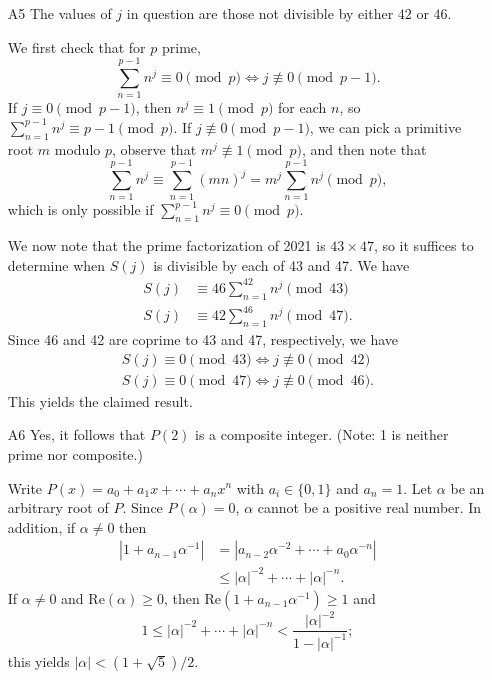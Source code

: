 \documentclass[amssymb,twocolumn,pra,10pt,aps]{revtex4-1}
\begin{document}
\begin{itemize}
\item[A5]
The values of $j$ in question are those not divisible by either $42$ or $46$.

We first check that for $p$ prime,
\[
\sum_{n=1}^{p-1} n^j \equiv 0 \pmod{p} \Leftrightarrow j \not\equiv 0 \pmod{p-1}.
\]
If $j \equiv 0 \pmod{p-1}$, then $n^j \equiv 1 \pmod{p}$ for each $n$, so $\sum_{n=1}^{p-1} n^j \equiv p-1 \pmod{p}$. If $j \not\equiv 0 \pmod{p-1}$, we can pick a primitive root $m$ modulo $p$,
observe that $m^j \not\equiv 1 \pmod{p}$, and then note that
\[
\sum_{n=1}^{p-1} n^j \equiv \sum_{n=1}^{p-1} (mn)^j = m^j \sum_{n=1}^{p-1} n^j \pmod{p},
\]
which is only possible if $\sum_{n=1}^{p-1} n^j \equiv 0 \pmod{p}$.

We now note that the prime factorization of 2021 is $43 \times 47$,
so it suffices to determine when $S(j)$ is divisible by each of 43 and 47.
We have
\begin{align*}
S(j) &\equiv 46 \sum_{n=1}^{42} n^j \pmod{43} \\
S(j) &\equiv 42 \sum_{n=1}^{46} n^j \pmod{47}.
\end{align*}
Since 46 and 42 are coprime to 43 and 47, respectively, 
we have 
\begin{gather*}
S(j) \equiv 0 \pmod{43} \Leftrightarrow j \not\equiv 0 \pmod{42} \\
S(j) \equiv 0 \pmod{47} \Leftrightarrow j \not\equiv 0 \pmod{46}.
\end{gather*}
This yields the claimed result.

\item[A6]
Yes, it follows that $P(2)$ is a composite integer. (Note: 1 is neither prime nor composite.)

Write $P(x) = a_0 + a_1 x + \cdots + a_n x^n$ with $a_i \in \{0,1\}$ and $a_n = 1$.
Let $\alpha$ be an arbitrary root of $P$. Since $P(\alpha) = 0$, $\alpha$ cannot be a positive real number.
%
In addition, if $\alpha \neq 0$ then
\begin{align*}
|1 + a_{n-1} \alpha^{-1}| &= |a_{n-2} \alpha^{-2} + \cdots + a_0 \alpha^{-n}| \\
&\leq |\alpha|^{-2} + \cdots + |\alpha|^{-n}.
\end{align*}
If $\alpha \neq 0$ and $\mathrm{Re}(\alpha) \geq 0$, then $\mathrm{Re}(1 + a_{n-1} \alpha^{-1}) \geq 1$
and 
\[
1 \leq |\alpha|^{-2} + \cdots + |\alpha|^{-n} < \frac{|\alpha|^{-2}}{1 - |\alpha|^{-1}};
\]
this yields $|\alpha| < (1 + \sqrt{5})/2$.


\end{itemize}
\end{document}
